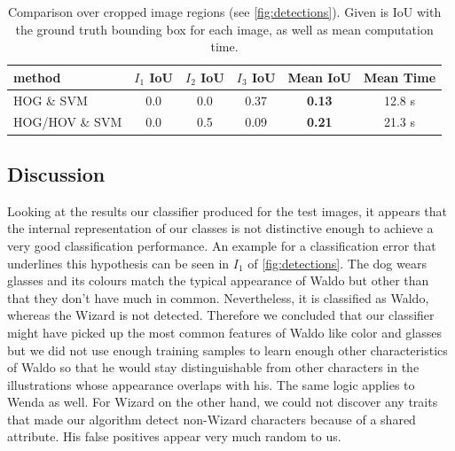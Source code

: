 \documentclass[11pt]{article}
\begin{document}
\begin{table}
    \centering
    \begin{tabular}{lccccc}
        \toprule
        method & \( I_1 \) IoU & \( I_2 \) IoU & \( I_3 \) IoU & Mean IoU & Mean Time \\
        \midrule
        HOG \& SVM              & 0.0   & 0.0 & 0.37 & \textbf{0.13} & 12.8 s \\
        HOG/HOV \& SVM          &  0.0  & 0.5 & 0.09 & \textbf{0.21} & 21.3 s \\
        \bottomrule
    \end{tabular}
    \caption{Comparison over cropped image regions (see \autoref{fig:detections}). Given is IoU with the ground truth bounding box for each image,
    as well as mean computation time.}
    \label{tab:class-iou}
\end{table}

\subsection{Discussion}




Looking at the results our classifier produced for the test images, it appears that the internal
representation of our classes is not distinctive enough to achieve a very good classification performance.
An example for a classification error that underlines this hypothesis can be seen in \( I_1 \) of
\autoref{fig:detections}. The dog wears glasses and its colours match the typical appearance of
Waldo but other than that they don't have much in common. Nevertheless, it is classified as Waldo,
whereas the Wizard is not detected. Therefore we concluded that our classifier
might have picked up the most common features of Waldo like color and glasses but we did not use
enough training samples to learn enough other characteristics of Waldo so that he would stay
distinguishable from other characters in the illustrations whose appearance overlaps with his. The
same logic applies to Wenda as well. For Wizard on the other hand, we could not discover any
traits that made our algorithm detect non-Wizard characters because of a shared attribute. His
false positives appear very much random to us.
\end{document}
